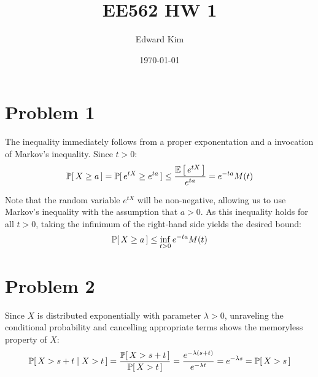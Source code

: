 \documentclass[12pt]{article}%
\title{EE562 HW 1}
\author{Edward Kim}
\date{\today}
\begin{document}
\maketitle
\section{Problem 1}

The inequality immediately follows from a proper exponentation and a invocation of Markov's inequality. Since $t > 0$:
%
\[ \mathbb{P}[\,X \geq a\,]  = \mathbb{P}[\,e^{tX} \geq e^{ta}\,] \leq \frac{\mathbb{E}\left[\,e^{tX}\,\right]}{e^{ta}} = e^{-ta}M(t)\]

Note that the random variable $e^{tX}$ will be non-negative, allowing us to use Markov's inequality with the assumption that $a > 0$. As this inequality holds for all $t > 0$, taking the infinimum of the right-hand side yields the desired bound:
%
\[ \mathbb{P}[\,X \geq a\,] \leq \inf_{t > 0}{e^{-ta}M(t)} \]

\section{Problem 2}

Since $X$ is distributed exponentially with parameter $\lambda > 0$, unraveling the conditional probability and cancelling appropriate terms shows the memoryless property of $X$:
%
\[ \mathbb{P}[\,X > s + t \mid X > t\,] = \frac{\mathbb{P}[\,X > s +t\,]}{\mathbb{P}[\,X > t\,]} = \frac{e^{-\lambda(s+t)}}{e^{-\lambda t}} = e^{-\lambda s} = \mathbb{P}[\,X > s\,]\]
\end{document}
